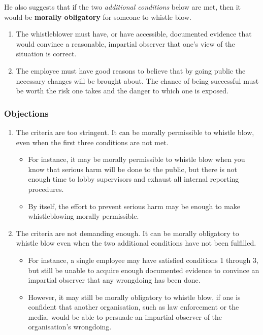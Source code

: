 \documentclass[11pt]{article}
\begin{document}
He also suggests that if the two \emph{additional conditions} below are met, then it would be \textbf{morally obligatory} for someone to whistle blow.
\begin{enumerate}
\item The whistleblower must have, or have accessible, documented evidence that would convince a reasonable, impartial observer that one's view of the situation is correct.
\item The employee must have good reasons to believe that by going public the necessary changes will be brought about. The chance of being successful must be worth the risk one takes and the danger to which one is exposed.
\end{enumerate}

\subsubsection{Objections}
\label{sec:orgc583bda}
\begin{enumerate}
\item The criteria are too stringent. It can be morally permissible to whistle blow, even when the first three conditions are not met.
\begin{itemize}
\item For instance, it may be morally permissible to whistle blow when you know that serious harm will be done to the public, but there is not enough time to lobby supervisors and exhaust all internal reporting procedures.
\item By itself, the effort to prevent serious harm may be enough to make whistleblowing morally permissible.
\end{itemize}

\item The criteria are not demanding enough. It can be morally obligatory to whistle blow even when the two additional conditions have not been fulfilled.
\begin{itemize}
\item For instance, a single employee may have satisfied conditions 1 through 3, but still be unable to acquire enough documented evidence to convince an impartial observer that any wrongdoing has been done.
\item However, it may still be morally obligatory to whistle blow, if one is confident that another organisation, such as law enforcement or the media, would be able to persuade an impartial observer of the organisation's wrongdoing.
\end{itemize}
\end{enumerate}
\end{document}
